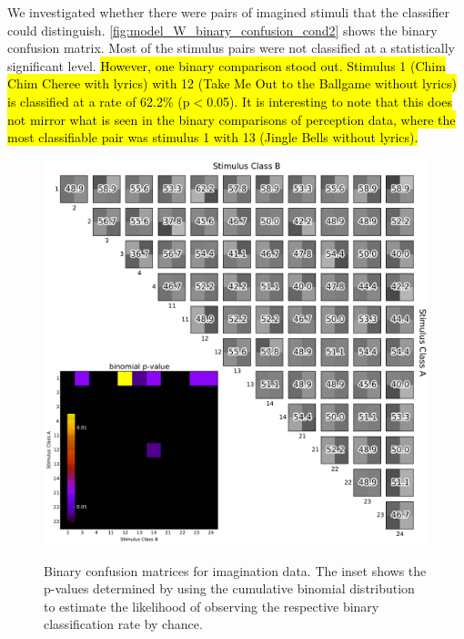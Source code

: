 We investigated whether there were pairs of imagined stimuli that the classifier could distinguish.
\autoref{fig:model_W_binary_confusion_cond2} shows the binary confusion matrix.
Most of the stimulus pairs were not classified at a statistically significant level. 
\hl{However, one binary comparison stood out. 
Stimulus 1 (Chim Chim Cheree with lyrics) with 12 (Take Me Out to the Ballgame without lyrics) is classified at a rate of 62.2\% (p$<$0.05). 
It is interesting to note that this does not mirror what is seen in the binary comparisons of perception data, where the most classifiable pair was stimulus 1 with 13 (Jingle Bells without lyrics). }
\begin{figure}[h] 
  \begin{center}
    \includegraphics[width=.75\textwidth,keepaspectratio=true]{Figures/model_W_binary_confusion_cond2}
   \\\vspace{-0.8em}
    \caption{Binary confusion matrices for imagination data.
    The inset shows the p-values determined by using the cumulative binomial distribution to estimate the likelihood of observing the respective binary classification rate by chance.}
    \label{fig:model_W_binary_confusion_cond2}
  \end{center}
  \vspace{-1em}
\end{figure}
\newpage
